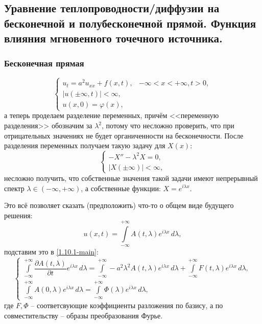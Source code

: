 \subsection{Уравнение теплопроводности/диффузии на бесконечной и полубесконечной прямой.
Функция влияния мгновенного точечного источника.}

\subsubsection{Бесконечная прямая}
\begin{equation}\label{1.10.1-main}
  \begin{cases}
    u_t = a^2 u_{xx} + f(x, t), &-\infty < x < +\infty, t > 0, \\
    |u(\pm \infty, t)| < \infty, \\
    u(x, 0) = \varphi(x),
  \end{cases}
\end{equation}
а теперь проделаем разделение переменных, причём <<переменную разделения>> обозначим за $\lambda^2$,
потому что несложно проверить, что при отрицательных значениях не будет органиченности на
бесконечности. После разделения переменных получаем такую задачу для $X(x)$:
\[
  \begin{cases}
    -X'' - \lambda^2 X = 0, \\
    |X(\pm \infty)| < \infty,
  \end{cases}
\]
несложно получить, что собственные значения такой задачи имеют непрерывный спектр
$\lambda \in (-\infty, +\infty)$, а собственные функции: $X = e^{i\lambda x}$.

Это всё позволяет сказать (предположить) что-то о общем виде будущего решения:
\[
  u(x, t) = \int\limits_{-\infty}^{+\infty} A(t, \lambda) e^{i \lambda x} \, d\lambda,
\]
подставим это в \eqref{1.10.1-main}:
\[
  \begin{cases}
    \int\limits_{-\infty}^{+\infty} \dfrac{\partial A(t, \lambda)}{\partial t} e^{i \lambda x} \, d\lambda
      = \int\limits_{-\infty}^{+\infty} - a^2 \lambda^2 A(t, \lambda) e^{i \lambda x} \, d\lambda
      + \int\limits_{-\infty}^{+\infty} F(t, \lambda) e^{i \lambda x} \, d\lambda, \\
    
    \int\limits_{-\infty}^{+\infty} A(0, \lambda) e^{i \lambda x} \, d\lambda 
      = \int\limits_{-\infty}^{+\infty} \Phi(\lambda) e^{i \lambda x} \, d\lambda,
  \end{cases}
\]
где $F, \Phi$ -- соответсвующие коэффициенты разложения по базису, а по совместительству -- образы 
преобразования Фурье.

